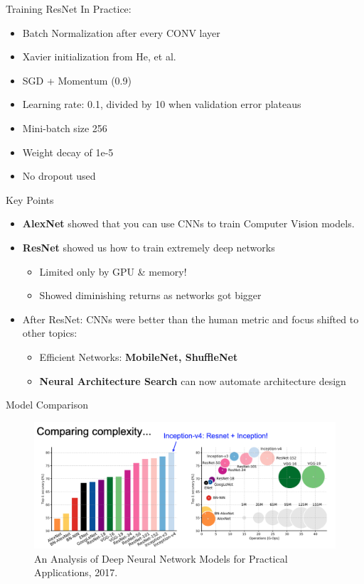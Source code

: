\documentclass[serif, aspectratio=169]{beamer}
\begin{document}
\begin{frame}{Training ResNet In Practice:}
	\begin{itemize}
		\item Batch Normalization after every CONV layer
		\item Xavier initialization from He, et al.
		\item SGD + Momentum (0.9)
		\item Learning rate: 0.1, divided by 10 when validation error plateaus
		\item Mini-batch size 256
		\item Weight decay of 1e-5
		\item No dropout used
	\end{itemize}
\end{frame}

\begin{frame}{Key Points}
	\begin{itemize}
		\item \textbf{AlexNet} showed that you can use CNNs to train Computer Vision models. 
		\item \textbf{ResNet} showed us how to train extremely deep networks
		\begin{itemize}
			\item Limited only by GPU \& memory!
			\item Showed diminishing returns as networks got bigger
		\end{itemize}
		\item After ResNet: CNNs were better than the human metric and focus shifted to other topics:
		\begin{itemize}
			\item Efficient Networks: \textbf{MobileNet, ShuffleNet}
			\item \textbf{Neural Architecture Search} can now automate architecture design
		\end{itemize}
	\end{itemize}
\end{frame}

\begin{frame}{Model Comparison}
	\begin{figure}[htpb]
		\begin{center}
			\includegraphics[keepaspectratio, scale=0.3]{pic/model_comp}
			\caption*{\scriptsize An Analysis of Deep Neural Network Models for Practical Applications, 2017.}
		\end{center}
	\end{figure}
\end{frame}
\end{document}

